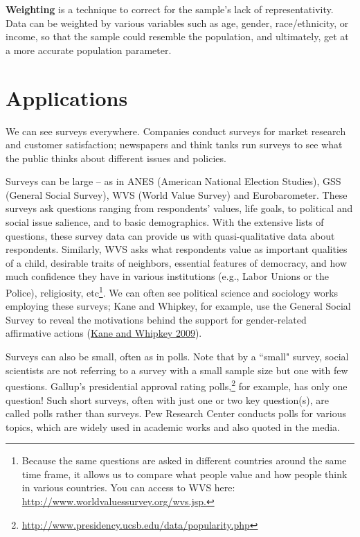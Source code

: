 \documentclass{book}
\begin{document}
\textbf{Weighting} is a technique to correct for the sample's lack of
representativity. Data can be weighted by various variables such as age,
gender, race/ethnicity, or income, so that the sample could resemble the
population, and ultimately, get at a more accurate population parameter.

\hypertarget{applications-1}{%
\section{Applications}\label{applications-1}}

We can see surveys everywhere. Companies conduct surveys for market research
and customer satisfaction; newspapers and think tanks run surveys to see what
the public thinks about different issues and policies.

Surveys can be large -- as in ANES (American National Election Studies), GSS
(General Social Survey), WVS (World Value Survey) and Eurobarometer. These
surveys ask questions ranging from respondents' values, life goals, to
political and social issue salience, and to basic demographics. With the
extensive lists of questions, these survey data can provide us with
quasi-qualitative data about respondents. Similarly, WVS asks what respondents
value as important qualities of a child, desirable traits of neighbors,
essential features of democracy, and how much confidence they have in various
institutions (e.g., Labor Unions or the Police), religiosity, etc\footnote{Because
  the same questions are asked in different countries around the same time
  frame, it allows us to compare what people value and how people think in
  various countries. You can access to WVS here:
  \url{http://www.worldvaluessurvey.org/wvs.jsp.}}. We can often see political
science and sociology works employing these surveys; Kane and Whipkey, for
example, use the General Social Survey to reveal the motivations behind the
support for gender-related affirmative actions
(\protect\hyperlink{ref-kane2009predictors}{Kane and Whipkey 2009}).

Surveys can also be small, often as in polls. Note that by a ``small" survey,
social scientists are not referring to a survey with a small sample size but
one with few questions. Gallup's presidential approval rating
polls,\footnote{\url{http://www.presidency.ucsb.edu/data/popularity.php}} for
example, has only one question! Such short surveys, often with just one or two
key question(s), are called polls rather than surveys. Pew Research Center
conducts polls for various topics, which are widely used in academic works and
also quoted in the media.
\end{document}
